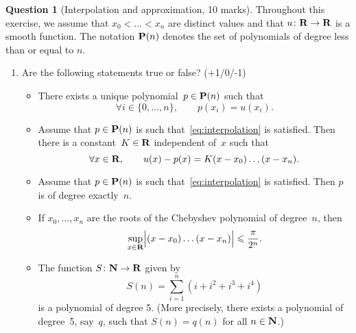 \documentclass[11pt]{article}
\theoremstyle{definition}
\newtheorem{question}{Question}
\begin{document}
\newpage
\begin{question}
    [Interpolation and approximation, 10 marks]
    Throughout this exercise, we assume
    that $x_0 < \dotsc < x_n$ are distinct values and
    that $u \colon \mathbf R \to \mathbf R$ is a smooth function.
    The notation $\mathbf P(n)$ denotes the set of polynomials of degree less than or equal to $n$.

    \begin{enumerate}
        \item
            Are the following statements true or false? (+1/0/-1)
            \begin{itemize}
                \item
                    There exists a unique polynomial~$p \in \mathbf P(n)$ such that
                    \begin{equation}
                        \label{eq:interpolation}
                        \forall i \in \{0, \dotsc, n\}, \qquad
                        p(x_i) = u (x_i).
                    \end{equation}

                \item
                    Assume that $p \in \mathbf P(n)$ is such that~\eqref{eq:interpolation} is satisfied.
                    Then there is a constant~$K \in \mathbf R$ independent of~$x$ such that
                    \[
                        \forall x \in \mathbf R,
                        \qquad u(x) - p(x) = K (x - x_0) \dotsc (x - x_n).
                    \]

                \item
                    Assume that $p \in \mathbf P(n)$ is such that~\eqref{eq:interpolation} is satisfied.
                    Then $p$ is of degree exactly~$n$.

                \item
                    If $x_0, \dotsc, x_n$ are the roots of the Chebyshev polynomial of degree~$n$,
                    then
                    \[
                        \sup_{x \in \mathbf R} \Bigl\lvert (x - x_0) \dotsc (x - x_n) \Bigr\rvert \leqslant \frac{\pi}{2^n}.
                    \]

                \item
                    The function $S\colon \mathbf N \to \mathbf R$ given by
                    \[
                        S(n) = \sum_{i=1}^{n} \left(i + i^2 + i^3 + i^4\right)
                    \]
                    is a polynomial of degree 5.
                    (More precisely, there exists a polynomial of degree~5,
                    say~$q$, such that $S(n) = q(n)$ for all $n \in \mathbf N$.)


\end{itemize}
\end{enumerate}
\end{question}
\end{document}
